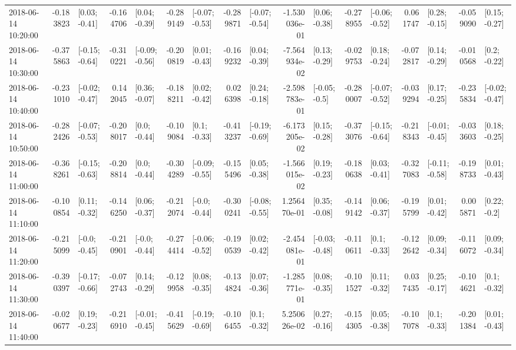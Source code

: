 \begin{tabular}{lrlrlrlrlrlrlrlrl}
2018-06-14 10:20:00 & -0.183823 &   [0.03; -0.41] & -0.164706 &   [0.04; -0.39] & -0.289149 &  [-0.07; -0.53] & -0.289871 &  [-0.07; -0.54] & -1.530036e-01 &   [0.06; -0.38] & -0.278955 &  [-0.06; -0.52] &  0.061747 &   [0.28; -0.15] & -0.059090 &   [0.15; -0.27] \\
2018-06-14 10:30:00 & -0.375863 &  [-0.15; -0.64] & -0.310221 &  [-0.09; -0.56] & -0.200819 &   [0.01; -0.43] & -0.169232 &   [0.04; -0.39] & -7.564934e-02 &   [0.13; -0.29] & -0.029753 &   [0.18; -0.24] & -0.072817 &   [0.14; -0.29] & -0.010568 &    [0.2; -0.22] \\
2018-06-14 10:40:00 & -0.231010 &  [-0.02; -0.47] &  0.142045 &   [0.36; -0.07] & -0.188211 &   [0.02; -0.42] &  0.026398 &   [0.24; -0.18] & -2.598783e-01 &   [-0.05; -0.5] & -0.280007 &  [-0.07; -0.52] & -0.039294 &   [0.17; -0.25] & -0.235834 &  [-0.02; -0.47] \\
2018-06-14 10:50:00 & -0.282426 &  [-0.07; -0.53] & -0.208017 &    [0.0; -0.44] & -0.109084 &    [0.1; -0.33] & -0.413237 &  [-0.19; -0.69] & -6.173205e-02 &   [0.15; -0.28] & -0.373076 &  [-0.15; -0.64] & -0.218343 &  [-0.01; -0.45] & -0.033603 &   [0.18; -0.25] \\
2018-06-14 11:00:00 & -0.368261 &  [-0.15; -0.63] & -0.208814 &    [0.0; -0.44] & -0.304289 &  [-0.09; -0.55] & -0.155496 &   [0.05; -0.38] & -1.566015e-02 &   [0.19; -0.23] & -0.180638 &   [0.03; -0.41] & -0.327083 &  [-0.11; -0.58] & -0.198733 &   [0.01; -0.43] \\
2018-06-14 11:10:00 & -0.100854 &   [0.11; -0.32] & -0.146250 &   [0.06; -0.37] & -0.212074 &   [-0.0; -0.44] & -0.300241 &  [-0.08; -0.55] &  1.256470e-01 &   [0.35; -0.08] & -0.149142 &   [0.06; -0.37] & -0.195799 &   [0.01; -0.42] &  0.005871 &    [0.22; -0.2] \\
2018-06-14 11:20:00 & -0.215099 &   [-0.0; -0.45] & -0.210901 &   [-0.0; -0.44] & -0.274414 &  [-0.06; -0.52] & -0.190539 &   [0.02; -0.42] & -2.454081e-01 &  [-0.03; -0.48] & -0.110611 &    [0.1; -0.33] & -0.122642 &   [0.09; -0.34] & -0.116072 &   [0.09; -0.34] \\
2018-06-14 11:30:00 & -0.390397 &  [-0.17; -0.66] & -0.072743 &   [0.14; -0.29] & -0.129958 &   [0.08; -0.35] & -0.134824 &   [0.07; -0.36] & -1.285771e-01 &   [0.08; -0.35] & -0.101527 &   [0.11; -0.32] &  0.037435 &   [0.25; -0.17] & -0.104621 &    [0.1; -0.32] \\
2018-06-14 11:40:00 & -0.020677 &   [0.19; -0.23] & -0.216910 &  [-0.01; -0.45] & -0.415629 &  [-0.19; -0.69] & -0.106455 &    [0.1; -0.32] &  5.250626e-02 &   [0.27; -0.16] & -0.154305 &   [0.05; -0.38] & -0.107078 &    [0.1; -0.33] & -0.201384 &   [0.01; -0.43] \\

\end{tabular}
